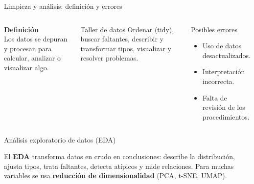 \documentclass[aspectratio=169]{beamer}
\begin{document}
\begin{frame}{Limpieza y an\'alisis: definici\'on y errores}
  \begin{columns}[t]
      \textbf{Definici\'on}\\[2pt]
      Los datos se depuran y procesan para calcular, analizar o visualizar algo.
      \vspace{0.4em}
      \begin{block}{Taller de datos}
        Ordenar (tidy), buscar faltantes, describir y transformar tipos,
        visualizar y resolver problemas.
      \end{block}
      \begin{block}{Posibles errores}
        \begin{itemize}
          \item Uso de datos desactualizados.
          \item Interpretaci\'on incorrecta.
          \item Falta de revisi\'on de los procedimientos.
        \end{itemize}
      \end{block}
  \end{columns}
\end{frame}

\begin{frame}[fragile]{An\'alisis exploratorio de datos (EDA)}
  \begin{center}
  \end{center}
  \vspace{0.3em}
  El \textbf{EDA} transforma datos en crudo en conclusiones: describe la
  distribuci\'on, ajusta tipos, trata faltantes, detecta at\'ipicos y mide
  relaciones. Para muchas variables se usa \textbf{reducci\'on de
  dimensionalidad} (PCA, t-SNE, UMAP).
\end{frame}
\end{document}
